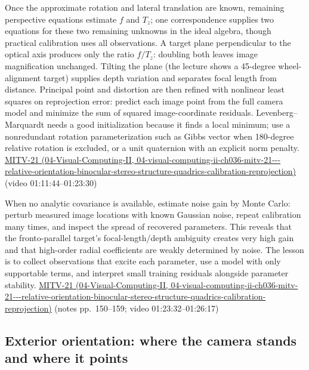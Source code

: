 Once the approximate rotation and lateral translation are known, remaining perspective equations estimate \(f\) and \(T_z\); one correspondence supplies two equations for these two remaining unknowns in the ideal algebra, though practical calibration uses all observations. A target plane perpendicular to the optical axis produces only the ratio \(f/T_z\): doubling both leaves image magnification unchanged. Tilting the plane (the lecture shows a 45-degree wheel-alignment target) supplies depth variation and separates focal length from distance. Principal point and distortion are then refined with nonlinear least squares on reprojection error: predict each image point from the full camera model and minimize the sum of squared image-coordinate residuals. Levenberg--Marquardt needs a good initialization because it finds a local minimum; use a nonredundant rotation parameterization such as Gibbs vector when 180-degree relative rotation is excluded, or a unit quaternion with an explicit norm penalty. \href{../04-Visual-Computing-II/main.pdf\#nameddest=04-visual-computing-ii-ch036-mitv-21---relative-orientation-binocular-stereo-structure-quadrics-calibration-reprojection}{MITV-21 (04-Visual-Computing-II, 04-visual-computing-ii-ch036-mitv-21-\/-\/-relative-orientation-binocular-stereo-structure-quadrics-calibration-reprojection)} (video 01:11:44--01:23:30)

When no analytic covariance is available, estimate noise gain by Monte Carlo: perturb measured image locations with known Gaussian noise, repeat calibration many times, and inspect the spread of recovered parameters. This reveals that the fronto-parallel target's focal-length/depth ambiguity creates very high gain and that high-order radial coefficients are weakly determined by noise. The lesson is to collect observations that excite each parameter, use a model with only supportable terms, and interpret small training residuals alongside parameter stability. \href{../04-Visual-Computing-II/main.pdf\#nameddest=04-visual-computing-ii-ch036-mitv-21---relative-orientation-binocular-stereo-structure-quadrics-calibration-reprojection}{MITV-21 (04-Visual-Computing-II, 04-visual-computing-ii-ch036-mitv-21-\/-\/-relative-orientation-binocular-stereo-structure-quadrics-calibration-reprojection)} (notes pp.~150--159; video 01:23:32--01:26:17)

\subsection{Exterior orientation: where the camera stands and where it points}\label{03-visual-computing-i-ch003-exterior-orientation-where-the-camera-stands-and-where-it-points}

